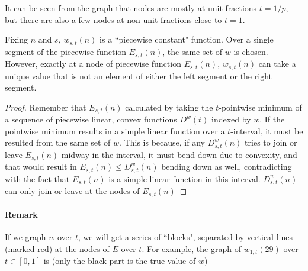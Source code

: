 \documentclass[]{article}
\begin{document}
It can be seen from the graph that nodes are mostly at unit fractions $t = 1/p$, but there are also a few nodes at non-unit fractions close to $t=1$.
\vspace{1cm}
\begin{lemma}[$w$ segment]
	Fixing $n$ and $s$, $w_{s,t}(n)$ is a ``piecewise constant" function. Over a single segment of the piecewise function $E_{s,t}(n)$, the same set of $w$ is chosen. However, exactly at a node of piecewise function $E_{s,t}(n)$, $w_{s,t}(n)$ can take a unique value that is not an element of either the left segment or the right segment.
\end{lemma}
\begin{proof}
	Remember that $E_{s,t}(n)$ calculated by taking the $t$-pointwise minimum of a sequence of piecewise linear, convex functions $D^w(t)$ indexed by $w$. If the pointwise minimum results in a simple linear function over a $t$-interval, it must be resulted from the same set of $w$. This is because, if any $D^w_{s,t}(n)$ tries to join or leave $E_{s,t}(n)$ midway in the interval, it must bend down due to convexity, and that would result in  $E_{s,t}(n) \le D^w_{s,t}(n)$ bending down as well, contradicting with the fact that $E_{s,t}(n)$ is a simple linear function in this interval. $D^w_{s,t}(n)$ can only join or leave at the nodes of $E_{s,t}(n)$
\end{proof}

\paragraph{Remark}

If we graph $w$ over $t$, we will get a series of ``blocks", separated by vertical lines (marked red) at the nodes of $E$ over $t$. For example, the graph of $w_{1,t}(29)$ over $t\in[0,1]$ is (only the black part is the true value of $w$)
\end{document}
